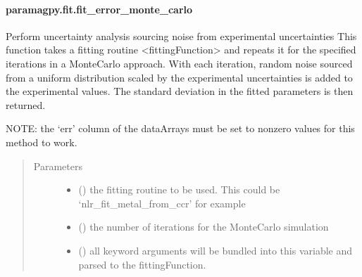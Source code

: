 \documentclass[a4paper,10pt,english,openany,oneside]{sphinxmanual}
\begin{document}
\paragraph{paramagpy.fit.fit\_error\_monte\_carlo}
\label{\detokenize{reference/generated/paramagpy.fit.fit_error_monte_carlo:paramagpy-fit-fit-error-monte-carlo}}\label{\detokenize{reference/generated/paramagpy.fit.fit_error_monte_carlo::doc}}

\begin{fulllineitems}
\label{\detokenize{reference/generated/paramagpy.fit.fit_error_monte_carlo:paramagpy.fit.fit_error_monte_carlo}}
\sphinxAtStartPar
Perform uncertainty analysis sourcing noise from experimental uncertainties
This function takes a fitting routine \textless{}fittingFunction\textgreater{} and repeats it for
the specified iterations in a Monte\sphinxhyphen{}Carlo approach. With each iteration,
random noise sourced from a uniform distribution scaled by the experimental
uncertainties is added to the experimental values. The standard deviation in
the fitted parameters is then returned.

\sphinxAtStartPar
NOTE: the ‘err’ column of the dataArrays must be set to non\sphinxhyphen{}zero values for
this method to work.
\begin{quote}\begin{description}
\item[{Parameters}] \leavevmode\begin{itemize}
\item {} 
\sphinxAtStartPar
{} () \textendash{} the fitting routine to be used.
This could be ‘nlr\_fit\_metal\_from\_ccr’ for example

\item {} 
\sphinxAtStartPar
{} () \textendash{} the number of iterations for the Monte\sphinxhyphen{}Carlo simulation

\item {} 
\sphinxAtStartPar
{} () \textendash{} all key\sphinxhyphen{}word arguments will be bundled into this variable and
parsed to the fittingFunction.


\end{itemize}
\end{description}
\end{quote}
\end{fulllineitems}
\end{document}
